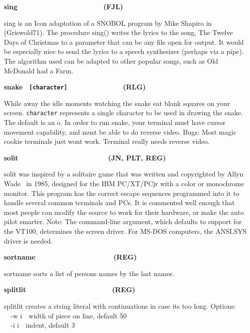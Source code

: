 {\sffamily\bfseries
sing\ \ \ \ \ \ \ \ \ \ \ \ \ \ \ \ \ \ \ \ \ \  (FJL)}

\textsf{sing} is an Icon adaptation of a SNOBOL program by Mike Shapiro
in (Griswold71). The procedure \textsf{sing()} writes the lyrics to the
song, {\textquotedbl}The Twelve Days of Christmas{\textquotedbl} to a
parameter that can be any file open for output. It would be especially
nice to send the lyrics to a speech synthesizer (perhaps via a pipe).
The algorithm used can be adapted to other popular songs, such as
{\textquotedbl}Old McDonald had a Farm{\textquotedbl}.

{\sffamily\bfseries
snake
\ \texttt{\textmd{[character]\ \ \ \ \ \ \ \ \ \ \ \ \ \ \ \ }}(RLG)}

While away the idle moments watching the snake eat blank squares on your
screen. \texttt{character} represents a single character to be used in
drawing the snake. The default is an
\textsf{{\textquotedbl}o{\textquotedbl}}. In order to run
\textsf{snake}, your terminal must have cursor movement capability, and
must be able to do reverse video. Bugs: Most magic cookie terminals
just won{\textquotesingle}t work. Terminal really needs reverse video.

{\sffamily\bfseries
solit\ \ \ \ \ \ \ \ \ \ \ \ \ \ \ \ \ \  \ \ \ \ \ (JN, PLT, REG)}

\textsf{solit} was inspired by a solitaire game that was written and
copyrighted by Allyn Wade \ in 1985, designed for the IBM PC/XT/PCjr
with a color or monochrome monitor. This program has the correct escape
sequences programmed into it to handle several common terminals and
PC{\textquotesingle}s. It is commented well enough that most people can
modify the source to work for their hardware, or make the auto pilot
smarter. Note: The command-line argument, which defaults to support for
the VT100, determines the screen driver. For MS-DOS computers, the
ANSI.SYS driver is needed.

{\sffamily\bfseries
sortname\ \ \ \ \ \ \ \ \ \ \ \ \ \ \ \ \ \ \ \ (REG)}

\textsf{sortname} sorts a list of person{\textquotesingle}s names by the
last names. 

{\sffamily\bfseries
splitlit\ \ \ \ \ \ \ \ \ \ \ \ \ \ \ \ \ \ \ \ \ \ (REG)}

\textsf{splitlit} creates a string literal with continuations in case
it{\textquotesingle}s too long. Options:\\
\ \ \textsf{{}-w i}\ \ width of piece on line, default 50\\
\ \ \textsf{{}-i i}\ \  indent, default 3

